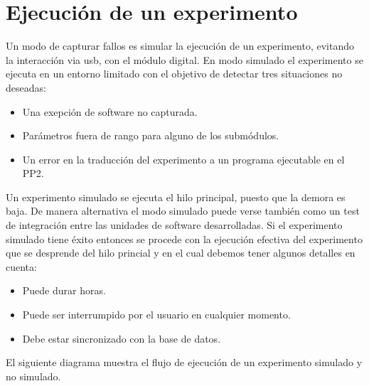 \section{Ejecuci\'on de un experimento}

Un modo de capturar fallos es simular la ejecuci\'on de un experimento,
evitando la interacci\'on via usb, con el m\'odulo digital.
En modo simulado el experimento se ejecuta en un entorno limitado con el objetivo de
detectar tres situaciones no deseadas:

\begin{itemize}
\item Una exepci\'on de software no capturada.
\item Par\'ametros fuera de rango para alguno de los subm\'odulos.
\item Un error en la traducci\'on del experimento a un programa ejecutable en el PP2.
\end{itemize}

Un experimento simulado se ejecuta el hilo principal, puesto que 
la demora es baja. De manera alternativa el modo simulado puede verse tambi\'en como un 
test de integraci\'on entre las unidades de software desarrolladas.
Si el experimento simulado tiene \'exito entonces se procede con la ejecuci\'on efectiva
del experimento que se desprende del hilo princial y en el cual debemos tener 
algunos detalles en cuenta:

\begin{itemize}
    \item Puede durar horas.
    \item Puede ser interrumpido por el usuario en cualquier momento.
    \item Debe estar sincronizado con la base de datos.
\end{itemize}

El siguiente diagrama muestra el flujo de ejecuci\'on de un experimento simulado y no simulado.

\newpage